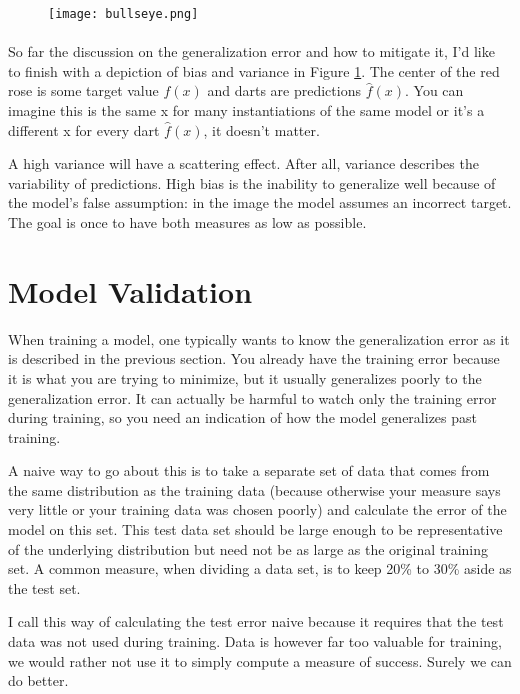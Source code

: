 \begin{figure}
\center
\texttt{[image: bullseye.png]}
\caption{}
\label{fig:bullseye}
\end{figure}

\paragraph{}
So far the discussion on the
generalization error and how to mitigate it,
I'd like to finish with a depiction
of bias and variance in Figure \ref{fig:bullseye}.
The center of the red rose
is some target value $f(x)$
and darts are predictions $\hat{f}(x)$.
You can imagine this is the same x
for many instantiations of the same model
or it's a different x for every dart $\hat{f}(x)$,
it doesn't matter.

A high variance will have a scattering effect.
After all,
variance describes the variability of predictions.
High bias is the inability to generalize
well because of the model's false assumption:
in the image the model assumes an incorrect target.
The goal is once to have both measures as low as possible.

\section{Model Validation}
When training a model,
one typically wants to know the generalization error
as it is described in the previous section.
You already have the training error
because it is what you are trying to minimize,
but it usually generalizes poorly
to the generalization error.
It can actually be harmful to
watch only the training error during training,
so you need an indication of how the model
generalizes past training.

A naive way to go about this
is to take a separate set of data
that comes from the same distribution
as the training data
(because otherwise your measure says very little
or your training data was chosen poorly)
and calculate the error of the model on this set.
This test data set should be large enough
to be representative of the underlying distribution
but need not be as large as the original training set.
A common measure,
when dividing a data set,
is to keep 20\% to 30\% aside
as the test set.

I call this way of calculating the test error naive
because it requires that the test data
was not used during training.
Data is however far too valuable for training,
we would rather not use it to simply
compute a measure of success.
Surely we can do better.


